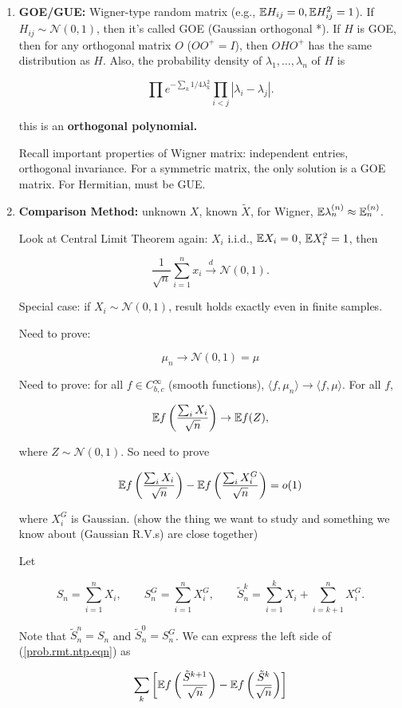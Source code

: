 \begin{enumerate}

\item \textbf{GOE/GUE:} Wigner-type random matrix (e.g., \(\mathbb{E} H_{ij} = 0, \mathbb{E} H_{ij}^2 = 1\)). If \(H_{ij} \sim \mathcal{N}(0,1)\), then it's called GOE (Gaussian orthogonal *). If \(H\) is GOE, then for any orthogonal matrix \(O\) (\(OO^+ = I\)), then \(OHO^+ \) has the same distribution as \(H\). Also, the probability density of \(\lambda_1, \ldots, \lambda_n\) of \(H\) is

\[
\prod e^{-\sum_k 1/4 \lambda_k^2} \prod_{i < j} |\lambda_i - \lambda_j|.
\]

this is an \textbf{orthogonal polynomial.} 

Recall important properties of Wigner matrix: independent entries, orthogonal invariance. For a symmetric matrix, the only solution is a GOE matrix. For Hermitian, must be GUE. 

\item \textbf{Comparison Method:} unknown \(X\), known \(\tilde{X}\), for Wigner, \(\mathbb{E} \lambda_n^{(n)} \approx \mathbb{E}_n^{(n)} \).

Look at Central Limit Theorem again: \(X_i\) i.i.d., \(\mathbb{E} X_i = 0\), \(\mathbb{E} X_i^2 = 1\), then 

\[
\frac{1}{\sqrt{n}} \sum_{i=1}^n x_i \xrightarrow{d} \mathcal{N}(0,1).
\]

Special case: if \(X_i \sim \mathcal{N}(0,1)\), result holds exactly even in finite samples.

Need to prove:

\[
\mu_n \to \mathcal{N}(0,1) = \mu
\]

Need to prove: for all \(f \in C_{b,c}^\infty\) (smooth functions), \(\langle f, \mu_n \rangle \to \langle f, \mu \rangle\). For all \(f\), 

\[
\mathbb{E} f \left( \frac{ \sum_{i} X_i}{\sqrt{n}} \right) \to \mathbb{E} f(Z),
\]

where \(Z \sim \mathcal{N}(0,1)\). So need to prove

\begin{equation}\label{prob.rmt.ntp.eqn}
\mathbb{E} f \left( \frac{ \sum_{i} X_i}{\sqrt{n}} \right) - \mathbb{E} f \left( \frac{ \sum_{i} X_i^G}{\sqrt{n}} \right) = o(1)
\end{equation}

where \(X_i^G\) is Gaussian. (show the thing we want to study and something we know about (Gaussian R.V.s) are close together)

Let 

\[
S_n = \sum_{i=1}^n X_i, \qquad S_n^G = \sum_{i=1}^n X_i^G, \qquad \tilde{S}_n^k = \sum_{i=1}^k X_i + \sum_{i=k+1}^n X_i^G.
\]

Note that \(\tilde{S}_n^n = S_n\) and \(\tilde{S}_n^0 = S_n^G\). We can express the left side of (\ref{prob.rmt.ntp.eqn}) as 

\[
\sum_k \left[\mathbb{E} f \left( \frac{  \tilde{S}^{k+1}}{\sqrt{n}} \right) - \mathbb{E} f \left( \frac{ \tilde{S}^k}{\sqrt{n}} \right)  \right] 
\]

\end{enumerate}

